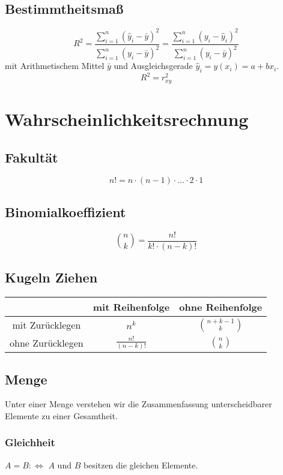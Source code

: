 \documentclass[12pt]{article}
\begin{document}
\subsection{Bestimmtheitsmaß}
\begin{equation*}
	R^2 = \frac{\sum_{i=1}^n (\hat{y}_i-\bar{y})^2}{\sum_{i=1}^n (y_i-\bar{y})^2} = \frac{\sum_{i=1}^n (y_i - \hat{y}_i)^2}{\sum_{i=1}^n (y_i-\bar{y})^2}
\end{equation*}
mit Arithmetischem Mittel $\bar{y}$ und Ausgleichsgerade $\hat{y}_i = y(x_i) = a+bx_i$.
\begin{equation*}
	R^2 = r_{xy}^2
\end{equation*}

\section{Wahrscheinlichkeitsrechnung}
\subsection{Fakultät}
\begin{equation*}
	n! = n \cdot (n-1) \cdot \dotsc \cdot 2 \cdot 1 
\end{equation*}
\subsection{Binomialkoeffizient}
\begin{equation*}
	{n \choose k} = \frac{n!}{k!\cdot(n-k)!}
\end{equation*}
\subsection{Kugeln Ziehen}
\begin{tabular}{c|c|c}
	 & mit Reihenfolge & ohne Reihenfolge 
	 \\\hline
	 mit Zurücklegen & $n^k$ & ${n+k-1 \choose k}$
	 \\\hline
	 ohne Zurücklegen & $\frac{n!}{(n-k)!}$ & ${n \choose k}$
\end{tabular}
\subsection{Menge}
Unter einer Menge verstehen wir die Zusammenfassung unterscheidbarer Elemente zu einer Gesamtheit.
\subsubsection{Gleichheit}
$A = B:\Leftrightarrow$ $A$ und $B$ besitzen die gleichen Elemente.
\end{document}
